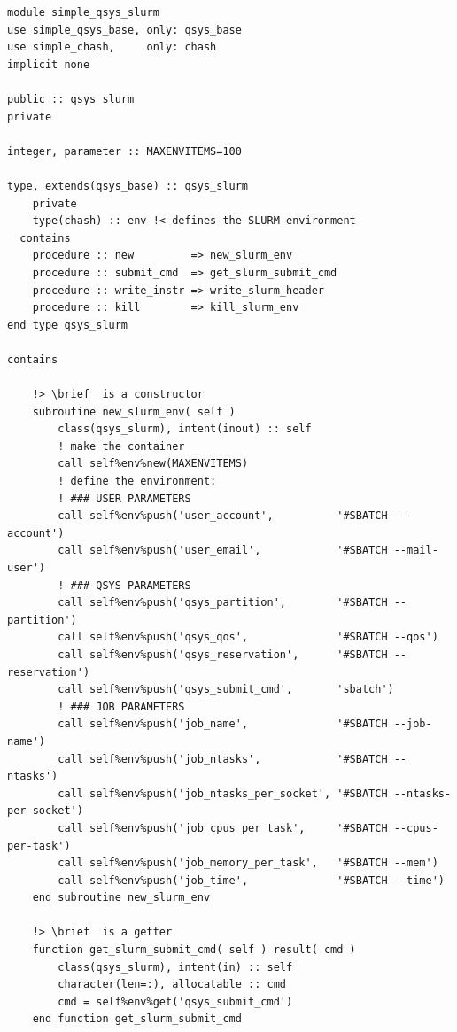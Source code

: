 \documentclass[a4paper,11pt]{article}
\begin{document}
\begin{verbatim}
module simple_qsys_slurm
use simple_qsys_base, only: qsys_base
use simple_chash,     only: chash
implicit none

public :: qsys_slurm
private

integer, parameter :: MAXENVITEMS=100

type, extends(qsys_base) :: qsys_slurm
    private
    type(chash) :: env !< defines the SLURM environment
  contains
    procedure :: new         => new_slurm_env
    procedure :: submit_cmd  => get_slurm_submit_cmd
    procedure :: write_instr => write_slurm_header
    procedure :: kill        => kill_slurm_env
end type qsys_slurm

contains
    
    !> \brief  is a constructor
    subroutine new_slurm_env( self )
        class(qsys_slurm), intent(inout) :: self
        ! make the container
        call self%env%new(MAXENVITEMS)
        ! define the environment:
        ! ### USER PARAMETERS
        call self%env%push('user_account',          '#SBATCH --account')
        call self%env%push('user_email',            '#SBATCH --mail-user')
        ! ### QSYS PARAMETERS
        call self%env%push('qsys_partition',        '#SBATCH --partition')
        call self%env%push('qsys_qos',              '#SBATCH --qos')
        call self%env%push('qsys_reservation',      '#SBATCH --reservation')
        call self%env%push('qsys_submit_cmd',       'sbatch')
        ! ### JOB PARAMETERS
        call self%env%push('job_name',              '#SBATCH --job-name')
        call self%env%push('job_ntasks',            '#SBATCH --ntasks')
        call self%env%push('job_ntasks_per_socket', '#SBATCH --ntasks-per-socket')
        call self%env%push('job_cpus_per_task',     '#SBATCH --cpus-per-task') 
        call self%env%push('job_memory_per_task',   '#SBATCH --mem')
        call self%env%push('job_time',              '#SBATCH --time')
    end subroutine new_slurm_env

    !> \brief  is a getter
    function get_slurm_submit_cmd( self ) result( cmd )
        class(qsys_slurm), intent(in) :: self
        character(len=:), allocatable :: cmd
        cmd = self%env%get('qsys_submit_cmd')
    end function get_slurm_submit_cmd


\end{verbatim}
\end{document}
